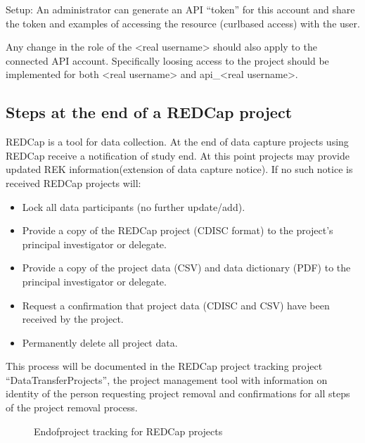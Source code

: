 \documentclass[letterpaper,10pt,english]{sphinxmanual}
\begin{document}
\sphinxAtStartPar
Setup: An administrator can generate an API “token” for this account and share the token and examples of accessing the resource (curl\sphinxhyphen{}based access) with the user.

\sphinxAtStartPar
Any change in the role of the \textless{}real username\textgreater{} should also apply to the connected API account. Specifically loosing access to the project should be implemented for both \textless{}real username\textgreater{} and api\_\textless{}real username\textgreater{}.


\subsection{Steps at the end of a REDCap project}
\label{\detokenize{ServerAdmin/index:steps-at-the-end-of-a-redcap-project}}
\sphinxAtStartPar
REDCap is a tool for data collection. At the end of data capture projects using REDCap receive a notification of study end. At this point projects may provide updated REK information(extension of data capture notice). If no such notice is received REDCap projects will:
\begin{itemize}
\item {} 
\sphinxAtStartPar
Lock all data participants (no further update/add).

\item {} 
\sphinxAtStartPar
Provide a copy of the REDCap project (CDISC format) to the project’s principal investigator or delegate.

\item {} 
\sphinxAtStartPar
Provide a copy of the project data (CSV) and data dictionary (PDF) to the principal investigator or delegate.

\item {} 
\sphinxAtStartPar
Request a confirmation that project data (CDISC and CSV) have been received by the project.

\item {} 
\sphinxAtStartPar
Permanently delete all project data.

\end{itemize}

\sphinxAtStartPar
This process will be documented in the REDCap project tracking project “DataTransferProjects”, the project management tool with information on identity of the person requesting project removal and confirmations for all steps of the project removal process.

\begin{figure}[htbp]
\centering
\capstart

\noindent{}
\caption{End\sphinxhyphen{}of\sphinxhyphen{}project tracking for REDCap projects}\label{\detokenize{ServerAdmin/index:id2}}\end{figure}
\end{document}
